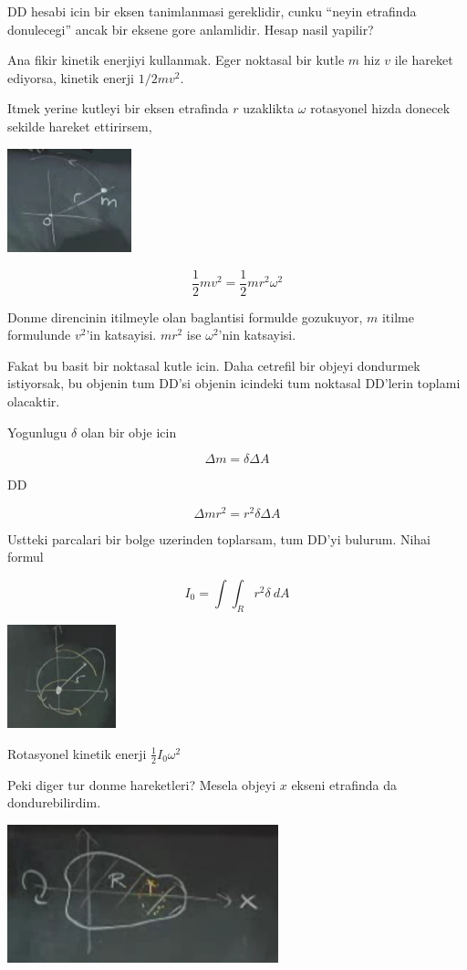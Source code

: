 \documentclass[12pt,fleqn]{article}
\begin{document}
DD hesabi icin bir eksen tanimlanmasi gereklidir, cunku ``neyin etrafinda
donulecegi'' ancak bir eksene gore anlamlidir. Hesap nasil yapilir? 

Ana fikir kinetik enerjiyi kullanmak. Eger noktasal bir kutle $m$ hiz $v$
ile hareket ediyorsa, kinetik enerji $1/2 mv^2$. 

Itmek yerine kutleyi bir eksen etrafinda $r$ uzaklikta $\omega$ rotasyonel
hizda donecek sekilde hareket ettirirsem,

\includegraphics[height=3cm]{17_4.png}

\[ \frac{1}{2}mv^2 = \frac{1}{2}mr^2\omega^2  \]

Donme direncinin itilmeyle olan baglantisi formulde gozukuyor, $m$ itilme
formulunde $v^2$'in katsayisi. $mr^2$ ise $\omega^2$'nin katsayisi.

Fakat bu basit bir noktasal kutle icin. Daha cetrefil bir objeyi dondurmek
istiyorsak, bu objenin tum DD'si objenin icindeki tum noktasal DD'lerin
toplami olacaktir. 

Yogunlugu $\delta$ olan bir obje icin 

\[ \Delta m = \delta \Delta A \]

DD

\[ \Delta m r^2 = r^2 \delta \Delta A \]

Ustteki parcalari bir bolge uzerinden toplarsam, tum DD'yi bulurum. Nihai
formul

\[ I_0 = \int \int_R r^2 \delta \ dA \]

\includegraphics[height=3cm]{17_5.png}

Rotasyonel kinetik enerji $\frac{1}{2}I_0 \omega^2$

Peki diger tur donme hareketleri? Mesela objeyi $x$ ekseni etrafinda da
dondurebilirdim. 

\includegraphics[height=4cm]{17_6.png}
\end{document}
